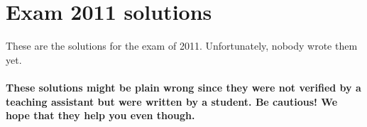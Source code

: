 \documentclass[main]{subfiles}
\begin{document}

\section{Exam 2011 solutions}
These are the solutions for the exam of 2011. Unfortunately, nobody wrote them yet.
\\\\
\textbf{These solutions might be plain wrong since they were not verified by a teaching assistant but were written by a student. Be cautious! We hope that they help you even though.}

\end{document}

